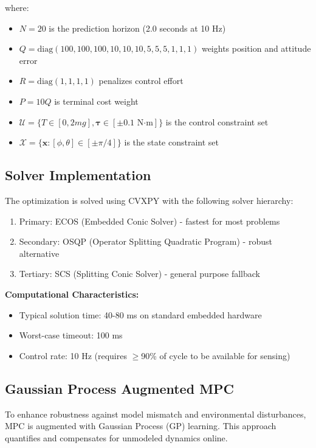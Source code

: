 \documentclass[journal]{IEEEtran}
\begin{document}
where:
\begin{itemize}
    \item $N = 20$ is the prediction horizon (2.0 seconds at 10 Hz)
    \item $Q = \text{diag}(100, 100, 100, 10, 10, 10, 5, 5, 5, 1, 1, 1)$ weights position and attitude error
    \item $R = \text{diag}(1, 1, 1, 1)$ penalizes control effort
    \item $P = 10Q$ is terminal cost weight
    \item $\mathcal{U} = \{T \in [0, 2mg], \boldsymbol{\tau} \in [\pm 0.1 \text{ N·m}]\}$ is the control constraint set
    \item $\mathcal{X} = \{\mathbf{x} : [\phi,\theta] \in [\pm \pi/4]\}$ is the state constraint set
\end{itemize}

\subsection{Solver Implementation}

The optimization is solved using CVXPY with the following solver hierarchy:
\begin{enumerate}
    \item Primary: ECOS (Embedded Conic Solver) - fastest for most problems
    \item Secondary: OSQP (Operator Splitting Quadratic Program) - robust alternative
    \item Tertiary: SCS (Splitting Conic Solver) - general purpose fallback
\end{enumerate}

\textbf{Computational Characteristics:}
\begin{itemize}
    \item Typical solution time: 40-80 ms on standard embedded hardware
    \item Worst-case timeout: 100 ms
    \item Control rate: 10 Hz (requires $\geq$90\% of cycle to be available for sensing)
\end{itemize}

\subsection{Gaussian Process Augmented MPC}

To enhance robustness against model mismatch and environmental disturbances, MPC is augmented with Gaussian Process (GP) learning. This approach quantifies and compensates for unmodeled dynamics online.
\end{document}
